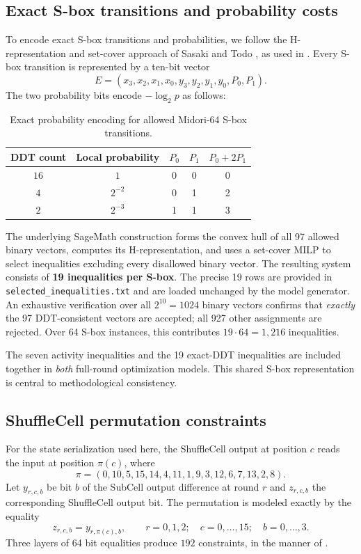 \documentclass[11pt,a4paper]{article}
\begin{document}
\subsection{Exact S-box transitions and probability costs}
To encode exact S-box transitions and probabilities, we follow the
H-representation and set-cover approach of Sasaki and Todo
\cite{sasaki2017}, as used in \cite[Sec.~4.1]{ilter2023}.
Every S-box transition is represented by a ten-bit vector
\[
 E=(x_3,x_2,x_1,x_0,y_3,y_2,y_1,y_0,P_0,P_1).
\]
The two probability bits encode $-\log_2 p$ as follows:
\begin{table}[H]
 \centering
 \caption{Exact probability encoding for allowed Midori-64 S-box transitions.}
 \begin{tabular}{ccccc}
 \toprule
 DDT count & Local probability & $P_0$ & $P_1$ & $P_0+2P_1$\\
 \midrule
 $16$ & $1$ & 0 & 0 & 0\\
 $4$ & $2^{-2}$ & 0 & 1 & 2\\
 $2$ & $2^{-3}$ & 1 & 1 & 3\\
 \bottomrule
 \end{tabular}
\end{table}
The underlying SageMath construction forms the convex hull of all 97 allowed
binary vectors, computes its H-representation, and uses a set-cover MILP to
select inequalities excluding every disallowed binary vector. The resulting
system consists of \textbf{19 inequalities per S-box}. The precise 19 rows
are provided in \texttt{selected\_inequalities.txt} and are loaded unchanged
by the model generator. An exhaustive verification over all $2^{10}=1024$
binary vectors confirms that \emph{exactly} the 97 DDT-consistent vectors
are accepted; all 927 other assignments are rejected. Over 64 S-box instances,
this contributes $19\cdot64=1,216$ inequalities.

The seven activity inequalities and the 19 exact-DDT inequalities
are included together in \emph{both} full-round optimization models. This
shared S-box representation is central to methodological consistency.

\subsection{ShuffleCell permutation constraints}
For the state serialization used here, the ShuffleCell output at position $c$
reads the input at position $\pi(c)$, where
\begin{equation}\label{eq:shuffle}
\pi=(0,10,5,15,14,4,11,1,9,3,12,6,7,13,2,8).
\end{equation}
Let $y_{r,c,b}$ be bit $b$ of the SubCell output difference at round $r$ and
$z_{r,c,b}$ the corresponding ShuffleCell output bit. The permutation is
modeled exactly by the equality
\begin{equation}\label{eq:sh-eq}
 z_{r,c,b}=y_{r,\pi(c),b},\qquad
 r=0,1,2;\quad c=0,\ldots,15;\quad b=0,\ldots,3.
\end{equation}
Three layers of 64 bit equalities produce $192$ constraints, in the manner of
\cite[Sec.~4.2]{ilter2023}.
\end{document}
